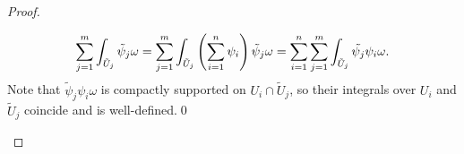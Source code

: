 \documentclass[../Moduli_Spaces_of_Riemann_Surfaces.tex]{subfiles}
\begin{document}
\begin{proof}
\begin{itemize}
\begin{equation*}
\begin{gathered}
                        \sum_{j=1}^{m}\int_{\tilde{U}_j}\tilde{\psi}_j\omega=\sum_{j=1}^{m}\int_{\tilde{U}_j}\left(\sum_{i=1}^{n}\psi_i\right)\tilde{\psi}_j\omega=\sum_{i=1}^{n}\sum_{j=1}^{m}\int_{\tilde{U}_j}\tilde{\psi_j}\psi_i\omega.
                    \end{gathered}
                \end{equation*}
                Note that $\tilde{\psi}_j\psi_i\omega$ is compactly supported on $U_i\cap\tilde{U}_j$, so their integrals over $U_i$ and $\tilde{U}_j$ coincide and is well-defined.\qed
        \end{itemize}
    \end{proof}
\end{document}
